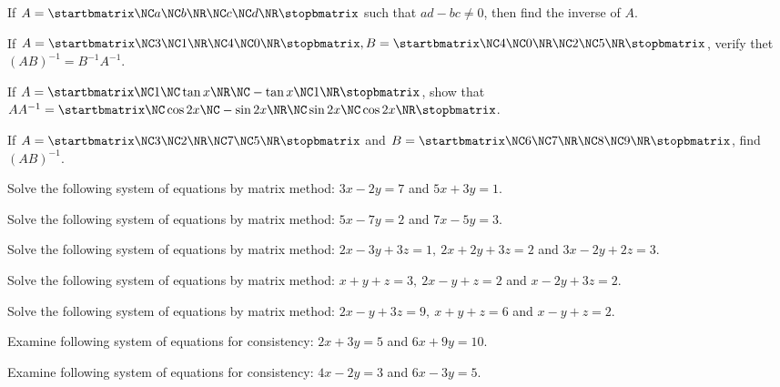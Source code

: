 \item If $A = \startbmatrix\NC a \NC b \NR\NC c \NC d\NR\stopbmatrix$ such that $ad - bc \neq 0$, then find the inverse of $A$.
\item If $A = \startbmatrix\NC 3 \NC 1 \NR\NC 4 \NC 0\NR\stopbmatrix, B = \startbmatrix\NC  4 \NC 0 \NR\NC 2 \NC 5 \NR\stopbmatrix$, verify thet $(AB)^{-1}
  = B^{-1}A^{-1}$.
\item If $A = \startbmatrix\NC 1 \NC \tan x \NR\NC -\tan x \NC 1\NR\stopbmatrix$, show that $AA^{-1} = \startbmatrix\NC \cos 2x \NC -\sin 2x
    \NR\NC \sin 2x \NC \cos 2x\NR\stopbmatrix$.
\item If $A = \startbmatrix\NC  3 \NC 2 \NR\NC 7 \NC 5 \NR\stopbmatrix$ and $B = \startbmatrix\NC  6 \NC 7 \NR\NC 8 \NC 9 \NR\stopbmatrix$, find $(AB)^{-1}$.
\item Solve the following system of equations by matrix method: $3x - 2y = 7$ and $5x + 3y = 1$.
\item Solve the following system of equations by matrix method: $5x - 7y = 2$ and $7x -5y = 3$.
\item Solve the following system of equations by matrix method: $2x - 3y + 3z = 1,\ 2x + 2y + 3z = 2$ and $3x -2y + 2z = 3$.
\item Solve the following system of equations by matrix method: $x + y + z = 3,\ 2x - y + z = 2$ and $x - 2y + 3z = 2$.
\item Solve the following system of equations by matrix method: $2x - y + 3z = 9,\ x + y + z = 6$ and $x - y + z = 2$.
\item Examine following system of equations for consistency: $2x + 3y = 5$ and $6x + 9y = 10$.
\item Examine following system of equations for consistency: $4x - 2y = 3$ and $6x - 3y = 5$.
\stopitemize
